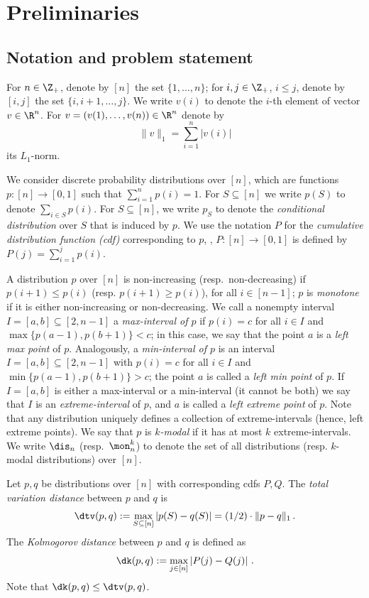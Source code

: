 \section{Preliminaries} \label{sec:prelims}

\subsection{Notation and problem statement} \label{ssec:defs}
For $n \in \Z_+$, denote by $[n]$ the set $\{1, \ldots, n\}$;
for $i,j  \in \Z_+$, $i \leq j$, denote by $[i,j]$ the set $\{i, i+1, \ldots, j\}$.
We write $v(i)$ to denote the $i$-th element of vector $v \in \R^n$.
For $v=(v(1),\dots,v(n)) \in \R^n$ denote by 
\[
\|v\|_1 = \sum_{i=1}^n |v(i)|
\]
its $L_1$-norm.

We consider discrete probability distributions over $[n]$, which are
functions $p: [n] \to [0,1]$ such that $\sum_{i=1}^n p(i)=1$.
For $S \subseteq [n]$ we write $p(S)$ to denote $\sum_{i \in S} p(i)$.
 For $S \subseteq [n]$, we write $p_S$ to denote the \emph{conditional distribution}
over $S$ that is induced by $p$. We use the  notation $P$ for the
\emph{cumulative distribution function (cdf)} corresponding to $p$, \ie,
$P: [n] \to [0,1]$ is defined by $P(j) = \sum_{i=1}^j p(i)$.

A distribution $p$ over $[n]$ is non-increasing (resp.\ non-decreasing)
if $p(i+1) \leq p(i)$ (resp. $p(i+1) \geq p(i)$), for all $i \in [n-1]$;
$p$ is \emph{monotone} if it is either non-increasing or non-decreasing.
We call a nonempty interval $I=[a,b] \subseteq [2, n-1]$ a \emph{max-interval of $p$} if
$p(i) = c$ for all $i \in I$ and $\max\{p(a-1), p(b+1)\} < c$; in this case,
we say that the point $a$ is a \emph{left max point} of $p$.
Analogously, a \emph{min-interval of $p$} is an interval
 $I=[a,b] \subseteq [2, n-1]$ with $p(i) = c$ for all $i \in I$ and $\min \{p(a-1), p(b+1)\} > c$;
 the point $a$ is called a \emph{left min point} of $p$.
If $I=[a,b]$ is either a max-interval or a min-interval (it cannot be both)
we say that $I$ is an \emph{extreme-interval} of $p$, and $a$ is called a \emph{left extreme point} of $p$.
Note that any distribution uniquely defines a collection of extreme-intervals (hence, left extreme points).
We say that $p$ is \emph{$k$-modal} if it has at most $k$ extreme-intervals.
{We write $\dis_n$ (resp.\ $\mon^k_n$) to denote the set of all distributions
(resp. $k$-modal distributions) over $[n]$.}


Let $p, q$ be distributions over $[n]$ with corresponding cdfs $P, Q$.
The \emph{total variation distance} between $p$ and $q$ is
\[
\dtv (p,q) := \max_{S \subseteq [n]} |p(S) - q(S)|  = (1/2)\cdot
\|p-q\|_1\,.
\]
The \emph{Kolmogorov distance} between $p$ and $q$ is defined as
\[
\dk(p,q):= \max_{j \in [n]} \left| P(j) - Q(j) \right|\,.
\]
Note that $\dk(p,q) \le \dtv (p,q)$.

